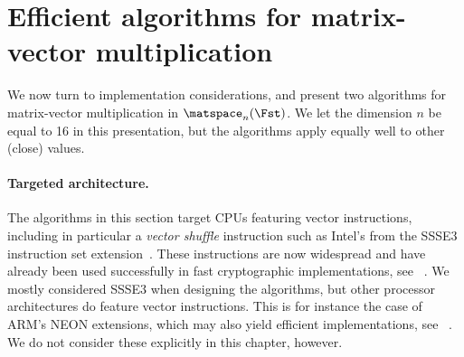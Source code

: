 \section{Efficient algorithms for matrix-vector multiplication}
\label{implem}

We now turn to implementation considerations, and present two algorithms
for matrix-vector multiplication in $\matspace_n(\Fst)$. We let the dimension
$n$ be equal to 16 in this presentation, but the algorithms apply equally well
to other (close) values.



\paragraph{Targeted architecture.}
The algorithms in this section target CPUs featuring vector instructions, including in particular a
\emph{vector shuffle} instruction such as Intel's \pshufb{} from the SSSE3 instruction set extension~\cite{ia64}. These instructions are
now widespread and have already been used successfully in fast cryptographic implementations, see \eg{}~\cite{vpaes,twine,sac2013}.
We mostly considered SSSE3 when designing the algorithms, but other processor architectures
do feature vector instructions. This is for instance the case of ARM's NEON extensions, which may also
yield efficient implementations, see \eg{}~\cite{Bernstein}. We do not consider these explicitly in this chapter, however.

